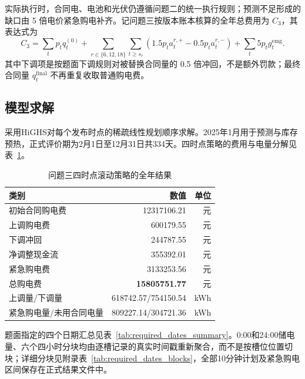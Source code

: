 \documentclass[withoutpreface,bwprint]{cumcmthesis}
\begin{document}
实际执行时，合同电、电池和光伏仍遵循问题二的统一执行规则；预测不足形成的缺口由 5 倍电价紧急购电补齐。记问题三按版本账本核算的全年总费用为 $C_3$，其表达式为
\begin{equation}
C_3=\sum_t p_tq_t^{(0)}
+\sum_{r\in\{6,12,18\}}\sum_{t\ge s_r}
\left(1.5p_ta_t^{r,+}-0.5p_ta_t^{r,-}\right)
+\sum_t5p_tg_t^{\mathrm{emg}} .
\end{equation}
其中下调项是按题面下调规则对被替换合同量的 0.5 倍冲回，不是额外罚款；最终合同量 $q_t^{\mathrm{final}}$ 不再重复收取普通购电费。

\subsection{模型求解}

采用HiGHS对每个发布时点的稀疏线性规划顺序求解。2025年1月用于预测与库存预热，正式评价期为2月1日至12月31日共334天。四时点策略的费用与电量分解见表~\ref{tab:q3_main_result}。

\begin{table}[!htbp]
\centering
\caption{问题三四时点滚动策略的全年结果}
\begin{tabular}{lrr}
\toprule
类别 & 数值 & 单位 \\
\midrule
初始合同购电费 & 12317106.21 & 元 \\
上调购电费 & 600179.55 & 元 \\
下调冲回 & 244787.55 & 元 \\
净调整现金流 & 355392.01 & 元 \\
紧急购电费 & 3133253.56 & 元 \\
总购电费 & \textbf{15805751.77} & 元 \\
上调量/下调量 & 618742.57/754150.54 & kWh \\
紧急购电量/未用合同电量 & 809227.14/304721.36 & kWh \\
\bottomrule
\end{tabular}
\label{tab:q3_main_result}
\end{table}

题面指定的四个日期汇总见表~\ref{tab:required_dates_summary}。0:00和24:00储电量、六个四小时分块均由逐槽记录的真实时间戳重新聚合，而不是按槽位位置切块；详细分块见附录表~\ref{tab:required_dates_blocks}，全部10分钟计划及紧急购电区间保存在正式结果文件中。
\end{document}
